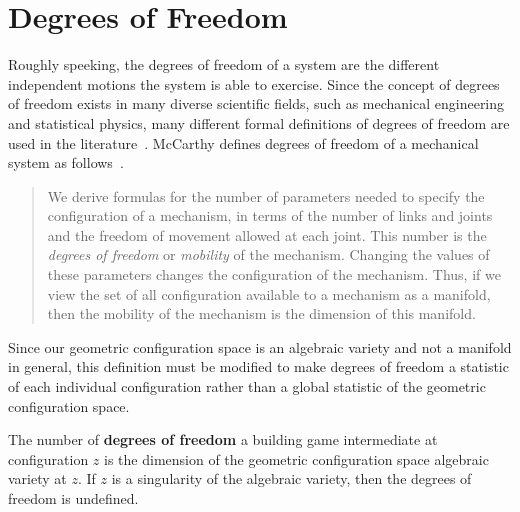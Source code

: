 \section{Degrees of Freedom}
Roughly speeking, the degrees of freedom of a system are the different independent motions the system is able to exercise. Since the concept of degrees of freedom exists in many diverse scientific fields, such as mechanical engineering and statistical physics, many different formal definitions of degrees of freedom are used in the literature~\cite{Pennestri2005}. McCarthy defines degrees of freedom of a mechanical system as follows~\cite{McCarthy1990}. 
\begin{quote}
We derive formulas for the number of parameters needed to specify the configuration of a mechanism, in terms of the number of links and joints and the freedom of movement allowed at each joint. This number is the \textit{degrees of freedom} or \textit{mobility} of the mechanism. Changing the values of these parameters changes the configuration of the mechanism. Thus, if we view the set of all configuration available to a mechanism as a manifold, then the mobility of the mechanism is the dimension of this manifold. 
\end{quote}

Since our geometric configuration space is an algebraic variety and not a manifold in general, this definition must be modified to make degrees of freedom a statistic of each individual configuration rather than a global statistic of the geometric configuration space. 

\begin{mydef}
The number of \textbf{degrees of freedom} a building game intermediate at configuration $z$ is the dimension of the geometric configuration space algebraic variety at $z$. If $z$ is a singularity of the algebraic variety, then the degrees of freedom is undefined.
\end{mydef}

